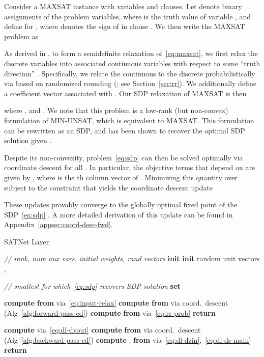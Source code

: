 \documentclass{article}
\begin{document}
	Consider a MAXSAT instance with  variables and  clauses.
	Let  denote binary assignments of the problem variables, where  is the truth value of variable , and define  for , where  denotes the sign of  in clause .
	We then write the MAXSAT problem as
	
	
	As derived in \citet{goemans1995improved, wang2018low}, 
to form a semidefinite relaxation of~\eqref{eq:maxsat}, we first relax the discrete variables  into associated continuous variables  with respect to some ``truth direction'' .
	Specifically, we relate the continuous  to the discrete  probabilistically via  based on randomized rounding (\citet{goemans1995improved}; see Section~\ref{sec:rr}).
	We additionally define a coefficient vector  associated with .
	Our SDP relaxation of MAXSAT is then
	
	where , and .
	We note that this problem is a low-rank (but non-convex) formulation of MIN-UNSAT, which is equivalent to MAXSAT.
	This formulation can be rewritten as an SDP, and has been shown to recover the optimal SDP solution given  \cite{barvinok1995problems, pataki1998rank}.
	
	Despite its non-convexity, problem~\eqref{eq:sdp} can then be solved optimally via coordinate descent for all .
	In particular, the objective terms that depend on  are given by , where  is the th column vector of .
	Minimizing this quantity over  subject to the constraint that  yields the coordinate descent update
	
	These updates provably converge to the globally optimal fixed point of the SDP~\eqref{eq:sdp} \cite{wang2017mixing}.
	A more detailed derivation of this update can be found in Appendix~\ref{appsec:coord-desc-fwd}.


	\begin{algorithm}[t!]
		\caption{SATNet Layer}
		\begin{algorithmic}[1]
			\State \emph{// rank, num aux vars, initial weights, rand vectors}
			\State \textbf{init}  \State \textbf{init} random unit vectors , 
			
			\State \emph{// smallest  for which~\eqref{eq:sdp} recovers SDP solution}
			\State \textbf{set}  \hspace{1em}
			
			\EndProcedure
			\State
			
			 \hspace{3.5em}
			\State \textbf{compute}  \textbf{from}  via~\eqref{eq:input-relax}
			\State \textbf{compute}  \textbf{from}  via coord.\ descent (Alg~\ref{alg:forward-pass-cd})
			\State \textbf{compute}  \textbf{from}  via~\eqref{eq:rr-prob}
			\State \textbf{return} 
			\EndProcedure
			\State
			
			\State \textbf{compute}  via~\eqref{eq:dl-dvout}
			\State \textbf{compute}  \textbf{from}   via coord.\ descent (Alg~\ref{alg:backward-pass-cd})
			\State \textbf{compute} ,  \textbf{from}  via~\eqref{eq:dl-dzin},~\eqref{eq:dl-ds-main}
			\State \textbf{return} 
			\EndProcedure
		\end{algorithmic}
		\label{alg:satnet}
	\end{algorithm}
	
\end{document}
